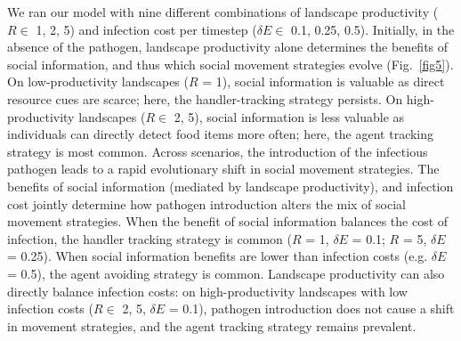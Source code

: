 We ran our model with nine different combinations of landscape productivity ($R \in $ 1, 2, 5) and infection cost per timestep ($\delta E \in$ 0.1, 0.25, 0.5).
Initially, in the absence of the pathogen, landscape productivity alone determines the benefits of social information, and thus which social movement strategies evolve (Fig.~\ref{fig5}).
On low-productivity landscapes ($R$ = 1), social information is valuable as direct resource cues are scarce; here, the handler-tracking strategy persists.
On high-productivity landscapes ($R \in$ 2, 5), social information is less valuable as individuals can directly detect food items more often; here, the agent tracking strategy is most common.
Across scenarios, the introduction of the infectious pathogen leads to a rapid evolutionary shift in social movement strategies.
The benefits of social information (mediated by landscape productivity), and infection cost jointly determine how pathogen introduction alters the mix of social movement strategies.
When the benefit of social information balances the cost of infection, the handler tracking strategy is common ($R$ = 1, $\delta E$ = 0.1; $R$ = 5, $\delta E$ = 0.25).
When social information benefits are lower than infection costs (e.g. $\delta E$ = 0.5), the agent avoiding strategy is common.
Landscape productivity can also directly balance infection costs: on high-productivity landscapes with low infection costs ($R \in$ 2, 5, $\delta E$ = 0.1), pathogen introduction does not cause a shift in movement strategies, and the agent tracking strategy remains prevalent.

